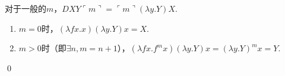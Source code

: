 \begin{pf} \rm \;
    对于一般的$m$，$DXY\ulcorner m\urcorner =\ulcorner m\urcorner (\lambda y.Y) X $.
    \begin{enumerate}
        \item $m=0$时，$(\lambda f x.x) (\lambda y.Y) x = X$.
        \item $m>0$时（即$\exists n, m=n+1$），$(\lambda fx.f^{m} x)(\lambda y.Y) x = (\lambda y.Y)^m x = Y$. 
    \end{enumerate}

    \qed 
\end{pf}